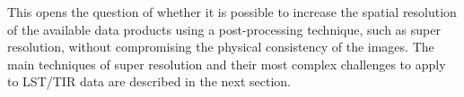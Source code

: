         This opens the question of whether it is possible to increase the spatial resolution of the available data products using a post-processing technique, such as super resolution, without compromising the physical consistency of the images.
        The main techniques of super resolution and their most complex challenges to apply to LST/TIR data are described in the next section.

\newpage